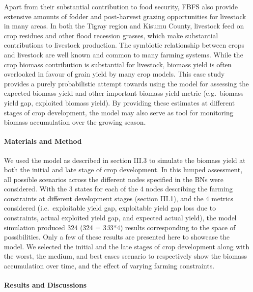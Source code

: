 \documentclass[11pt,preprint]{article}
\begin{document}
Apart from their substantial contribution to food security, FBFS also
provide extensive amounts of fodder and post-harvest grazing
opportunities for livestock in many areas. In both the Tigray region and
Kisumu County, livestock feed on crop residues and other flood recession
grasses, which make substantial contributions to livestock production.
The symbiotic relationship between crops and livestock are well known
and common to many farming systems. While the crop biomass contribution
is substantial for livestock, biomass yield is often overlooked in
favour of grain yield by many crop models. This case study provides a
purely probabilistic attempt towards using the model for assessing the
expected biomass yield and other important biomass yield metric
(e.g.~biomass yield gap, exploited biomass yield). By providing these
estimates at different stages of crop development, the model may also
serve as tool for monitoring biomass accumulation over the growing
season.

\hypertarget{materials-and-method-1}{%
\paragraph{Materials and Method}\label{materials-and-method-1}}

We used the model as described in section III.3 to simulate the biomass
yield at both the initial and late stage of crop development. In this
lumped assessment, all possible scenarios across the different nodes
specified in the BNs were considered. With the 3 states for each of the
4 nodes describing the farming constraints at different development
stages (section III.1), and the 4 metrics considered (i.e.~exploitable
yield gap, exploitable yield gap loss due to constraints, actual
exploited yield gap, and expected actual yield), the model simulation
produced 324 (324 = 3\emph{3}3*4) results corresponding to the space of
possibilities. Only a few of these results are presented here to
showcase the model. We selected the initial and the late stages of crop
development along with the worst, the medium, and best cases scenario to
respectively show the biomass accumulation over time, and the effect of
varying farming constraints.

\hypertarget{results-and-discussions-1}{%
\paragraph{Results and Discussions}\label{results-and-discussions-1}}
\end{document}
